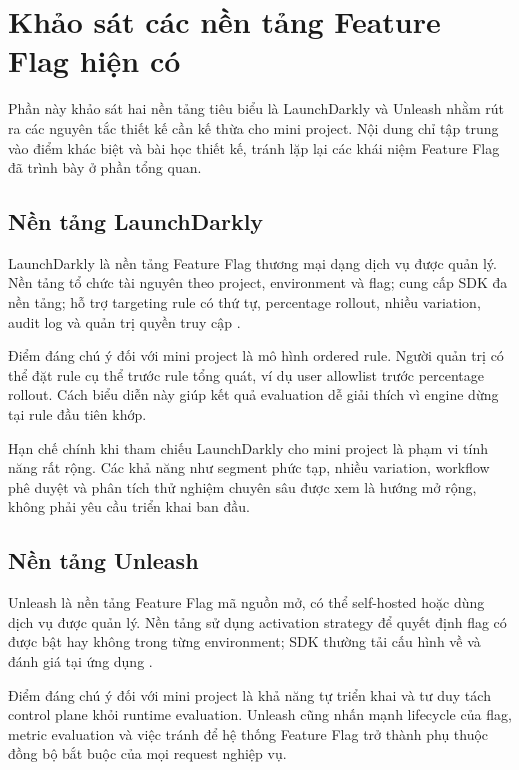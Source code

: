 \section{Khảo sát các nền tảng Feature Flag hiện có}

Phần này khảo sát hai nền tảng tiêu biểu là LaunchDarkly và Unleash nhằm rút ra các nguyên tắc thiết kế cần kế thừa cho mini project. Nội dung chỉ tập trung vào điểm khác biệt và bài học thiết kế, tránh lặp lại các khái niệm Feature Flag đã trình bày ở phần tổng quan.

\subsection{Nền tảng LaunchDarkly}

LaunchDarkly là nền tảng Feature Flag thương mại dạng dịch vụ được quản lý. Nền tảng tổ chức tài nguyên theo project, environment và flag; cung cấp SDK đa nền tảng; hỗ trợ targeting rule có thứ tự, percentage rollout, nhiều variation, audit log và quản trị quyền truy cập \cite{launchdarkly_feature_flags,launchdarkly_targeting_rules}.

Điểm đáng chú ý đối với mini project là mô hình ordered rule. Người quản trị có thể đặt rule cụ thể trước rule tổng quát, ví dụ user allowlist trước percentage rollout. Cách biểu diễn này giúp kết quả evaluation dễ giải thích vì engine dừng tại rule đầu tiên khớp.

Hạn chế chính khi tham chiếu LaunchDarkly cho mini project là phạm vi tính năng rất rộng. Các khả năng như segment phức tạp, nhiều variation, workflow phê duyệt và phân tích thử nghiệm chuyên sâu được xem là hướng mở rộng, không phải yêu cầu triển khai ban đầu.

\subsection{Nền tảng Unleash}

Unleash là nền tảng Feature Flag mã nguồn mở, có thể self-hosted hoặc dùng dịch vụ được quản lý. Nền tảng sử dụng activation strategy để quyết định flag có được bật hay không trong từng environment; SDK thường tải cấu hình về và đánh giá tại ứng dụng \cite{unleash_feature_flags,unleash_feature_flag_best_practices}.

Điểm đáng chú ý đối với mini project là khả năng tự triển khai và tư duy tách control plane khỏi runtime evaluation. Unleash cũng nhấn mạnh lifecycle của flag, metric evaluation và việc tránh để hệ thống Feature Flag trở thành phụ thuộc đồng bộ bắt buộc của mọi request nghiệp vụ.

